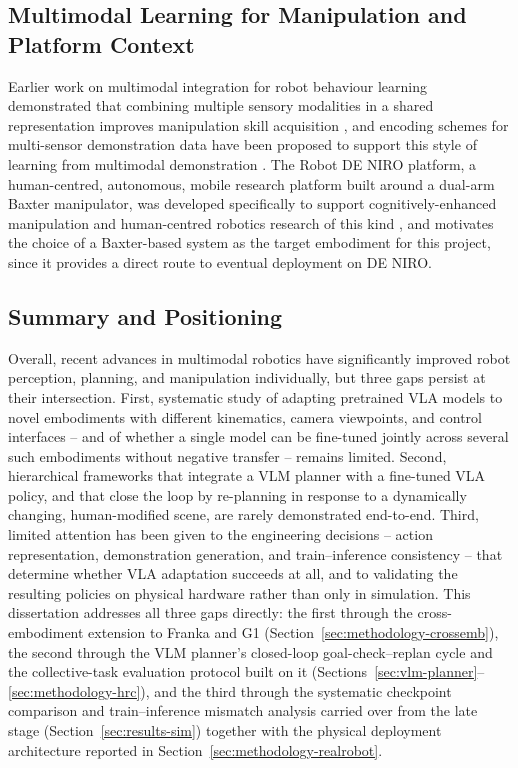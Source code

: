\documentclass[12pt]{article}
\begin{document}
\subsection{Multimodal Learning for Manipulation and Platform Context}

Earlier work on multimodal integration for robot behaviour learning demonstrated that combining multiple sensory modalities in a shared representation improves manipulation skill acquisition \cite{NODA2014721}, and encoding schemes for multi-sensor demonstration data have been proposed to support this style of learning from multimodal demonstration \cite{zeng2019encoding}. The Robot DE NIRO platform, a human-centred, autonomous, mobile research platform built around a dual-arm Baxter manipulator, was developed specifically to support cognitively-enhanced manipulation and human-centred robotics research of this kind \cite{falck2020robot, falck2018human}, and motivates the choice of a Baxter-based system as the target embodiment for this project, since it provides a direct route to eventual deployment on DE NIRO.

\subsection{Summary and Positioning}

Overall, recent advances in multimodal robotics have significantly improved robot perception, planning, and manipulation individually, but three gaps persist at their intersection. First, systematic study of adapting pretrained VLA models to novel embodiments with different kinematics, camera viewpoints, and control interfaces -- and of whether a single model can be fine-tuned jointly across several such embodiments without negative transfer -- remains limited. Second, hierarchical frameworks that integrate a VLM planner with a fine-tuned VLA policy, and that close the loop by re-planning in response to a dynamically changing, human-modified scene, are rarely demonstrated end-to-end. Third, limited attention has been given to the engineering decisions -- action representation, demonstration generation, and train--inference consistency -- that determine whether VLA adaptation succeeds at all, and to validating the resulting policies on physical hardware rather than only in simulation. This dissertation addresses all three gaps directly: the first through the cross-embodiment extension to Franka and G1 (Section~\ref{sec:methodology-crossemb}), the second through the VLM planner's closed-loop goal-check--replan cycle and the collective-task evaluation protocol built on it (Sections~\ref{sec:vlm-planner}--\ref{sec:methodology-hrc}), and the third through the systematic checkpoint comparison and train--inference mismatch analysis carried over from the late stage (Section~\ref{sec:results-sim}) together with the physical deployment architecture reported in Section~\ref{sec:methodology-realrobot}.
\end{document}
